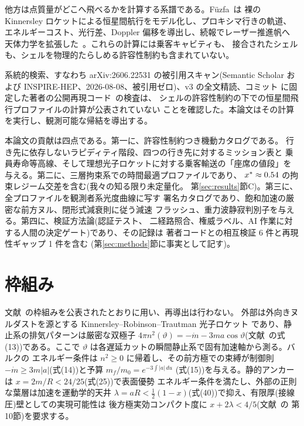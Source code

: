 \documentclass[11pt]{article}
\begin{document}
他方は点質量がどこへ飛べるかを計算する系譜である。F\"uzfa~\cite{fuzfa2019}は
裸の Kinnersley ロケットによる恒星間航行をモデル化し、プロキシマ行きの軌道、
エネルギーコスト、光行差、Doppler 偏移を導出し、続報でレーザー推進帆へ
天体力学を拡張した~\cite{fuzfa2020}。これらの計算には乗客キャビティも、
接合されたシェルも、シェルを物理的たらしめる許容性制約も含まれていない。

系統的検索、すなわち arXiv:2606.22531 の被引用スキャン(Semantic Scholar
および INSPIRE-HEP、2026-08-08、被引用ゼロ)、v3 の全文精読、コミット
\NmWtCommit{} に固定した著者の公開再現コード~\cite{worldtube}の検査は、
シェルの許容性制約の下での恒星間飛行プロファイルの計算が公表されていない
ことを確認した。本論文はその計算を実行し、観測可能な帰結を導出する。

本論文の貢献は四点である。第一に、許容性制約つき機動カタログである。
行き先に依存しないラピディティ階段、四つの行き先に対するミッション表と
乗員寿命等高線、そして理想光子ロケットに対する乗客輸送の「座席の値段」を
与える。第二に、三層拘束系での時間最適プロファイルであり、
$x^* \approx 0.54$ の拘束レジーム交差を含む(我々の知る限り未定量化。
第\ref{sec:results}節C)。第三に、全プロファイルを観測者系光度曲線に写す
署名カタログであり、飽和加速の厳密な前方ヌル、閉形式減衰則に従う減速
フラッシュ、重力波静寂判別子を与える。第四に、検証方法論(認証テスト、
二経路照合、権威ラベル、AI 作業に対する人間の決定ゲート)であり、その記録は
著者コードとの相互検証 6 件と再現性ギャップ 1 件を含む
(第\ref{sec:methods}節に事実として記す)。

\section{枠組み}\label{sec:framework}

文献~\cite{le-steering}の枠組みを公表されたとおりに用い、再導出は行わない。
外部は外向きヌルダストを源とする Kinnersley--Robinson--Trautman 光子ロケット
であり、静止系の排気パターンは厳密な双極子 $4\pi n^2(\vartheta) = -\dot m -
3ma\cos\vartheta$(文献~\cite{le-steering}の式(13))である。ここで
$\vartheta$ は各遅延カットの瞬間静止系で固有加速軸から測る。バルクの
エネルギー条件は $n^2 \geq 0$ に帰着し、その前方極での束縛が制御則
$-\dot m \geq 3m|a|$(式(14))と予算 $m_f/m_0 = e^{-3\int|a|\,du}$
(式(15))を与える。静的アンカーは $x = 2m/R < 24/25$(式(25))で表面優勢
エネルギー条件を満たし、外部の正則な葉層は加速を運動学的天井 $\lambda = aR
< \tfrac{1}{2}(1-x)$(式(40))で抑え、有限厚(接線圧)壁としての実現可能性は
後方極実効コンパクト度に $x + 2\lambda < 4/5$(文献~\cite{le-steering}の
第10節)を要求する。
\end{document}

